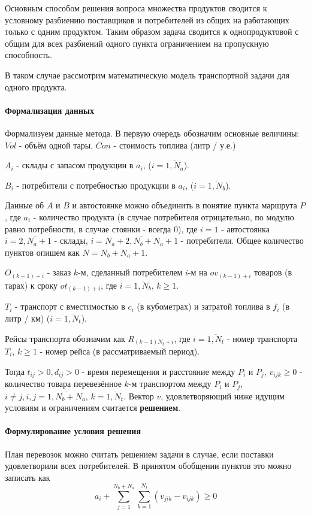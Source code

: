 	Основным способом решения вопроса множества продуктов сводится к условному разбиению поставщиков и потребителей из общих на работающих только с одним продуктом. Таким образом задача сводится к однопродуктовой с общим для всех разбиений одного пункта ограничением на пропускную способность.
	
	В таком случае рассмотрим математическую модель транспортной задачи для одного продукта.
	\paragraph{Формализация данных}
	Формализуем данные метода. В первую очередь обозначим основные величины: $Vol$ - объём одной тары, $Con$ - стоимость топлива (литр / у.е.)
	
	$A_i$ - склады с запасом продукции в $a_i$, ($i = \overline{1, N_a}$).
	
	$B_i$ - потребители с потребностью продукции в $a_i$, ($i = \overline{1, N_b}$).
	
	Данные об $A$ и $B$ и автостоянке можно объединить в понятие пункта маршрута $P$, где $a_i$ - количество продукта (в случае потребителя отрицательно, по модулю равно потребности, в случае стоянки - всегда 0), где $i = 1$ - автостоянка $i = \overline{2, N_a + 1}$ - склады, $i = \overline{N_a+2, N_b+N_a+1}$ - потребители. Общее количество пунктов опишем как $N = N_b+N_a+1$.
	
	$O_{(k-1) + i}$ - заказ $k$-м, сделанный потребителем $i$-м на $ov_{(k-1) + i}$ товаров (в тарах) к сроку $ot_{(k-1) + i}$, где $i = \overline{1, N_b}$, $k \ge 1$.
		
	$T_i$ - транспорт с вместимостью в $c_i$ (в кубометрах) и затратой топлива в $f_i$ (в литр / км) ($i = \overline{1, N_t}$). 
	
	Рейсы транспорта обозначим как $R_{(k-1)N_t + i}$, где $i = \overline{1, N_t}$ - номер транспорта $T_i$, $k \ge 1$ - номер рейса (в рассматриваемый период).
	
	Тогда $t_{ij} > 0, d_{ij} > 0$ - время перемещения и расстояние между $P_i$ и $P_j$, $v_{ijk} \ge 0$ - количество товара перевезённое $k$-м транспортом между $P_i$ и $P_j$, $i \ne j, i, j = \overline{1, N_b+N_a}$, $k = \overline{1, N_t}$. Вектор $v$, удовлетворяющий ниже идущим условиям и ограничениям считается \textbf{решением}.
	
	\paragraph{Формулирование условия решения}    
	План перевозок можно считать решением задачи в случае, если поставки удовлетворили всех потребителей. В принятом обобщении пунктов это можно записать как
	\begin{equation}
		a_i + \sum_{j=1}^{N_b+N_a} \sum_{k=1}^{N_t} (v_{jik} - v_{ijk}) \ge 0
	\end{equation}
	

